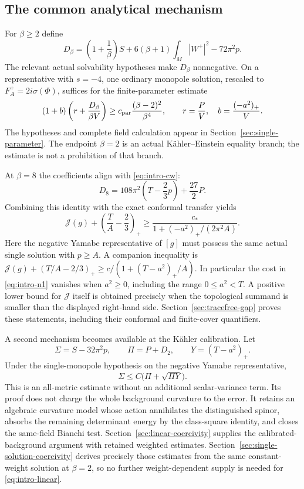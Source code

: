 \documentclass[10pt,a4paper]{article}
\theoremstyle{definition}
\theoremstyle{remark}
\numberwithin{equation}{section}
\providecommand{\J}{\mathcal J}
\begin{document}
\subsection{The common analytical mechanism}
For $\beta\ge2$ define
\[
 D_\beta=\left(1+\frac1\beta\right)S
       +6(\beta+1)\int_M|W^+|^2-72\pi^2p.
\]
The relevant actual solvability hypotheses make $D_\beta$ nonnegative.
On a representative with $s=-4$, one ordinary monopole solution, rescaled
to $F_A^+=2i\sigma(\Phi)$, suffices for the finite-parameter estimate
\begin{equation}\label{eq:intro-parameter}
 (1+b)\left(r+\frac{D_\beta}{\beta V}\right)
 \ge c_{\rm par}\frac{(\beta-2)^2}{\beta^4},
 \qquad r=\frac{P}{V},\quad b=\frac{(-a^2)_+}{V}.
\end{equation}
The hypotheses and complete field calculation appear in
Section~\ref{sec:single-parameter}. The endpoint $\beta=2$ is an actual
Kähler--Einstein equality branch; the estimate is not a prohibition of
that branch.

At $\beta=8$ the coefficients align with \eqref{eq:intro-cw}:
\[
 D_8=108\pi^2\left(T-\frac23p\right)+\frac{27}{2}P.
\]
Combining this identity with the exact conformal transfer yields
\begin{equation}\label{eq:intro-n1}
 \J(g)+\left(\frac TA-\frac23\right)_+
 \ge\frac{c_*}{1+(-a^2)_+/(2\pi^2A)}.
\end{equation}
Here the negative Yamabe representative of $[g]$ must possess the same
actual single solution with $p\ge A$. A companion inequality is
$\J(g)+(T/A-2/3)_+\ge c/(1+(T-a^2)_+/A)$. In particular the
cost in \eqref{eq:intro-n1} vanishes when $a^2\ge0$, including the
range $0\le a^2<T$. A positive lower bound for $\J$ itself is obtained
precisely when the topological summand is smaller than the displayed
right-hand side. Section~\ref{sec:tracefree-gap} proves these statements,
including their conformal and finite-cover quantifiers.

A second mechanism becomes available at the Kähler calibration. Let
\[
 \Sigma=S-32\pi^2p,\qquad \Pi=P+D_2,
 \qquad Y=(T-a^2)_+.
\]
Under the single-monopole hypothesis on the negative Yamabe representative,
\begin{equation}\label{eq:intro-linear}
 \Sigma\le C\bigl(\Pi+\sqrt{\Pi Y}\bigr).
\end{equation}
This is an all-metric estimate without an additional scalar-variance
term. Its proof does not charge the whole background curvature to the
error. It retains an algebraic curvature model whose action annihilates
the distinguished spinor, absorbs the remaining determinant energy by
the class-square identity, and closes the same-field Bianchi test.
Section~\ref{sec:linear-coercivity} supplies the calibrated-background
argument with retained weighted estimates. Section~\ref{sec:single-solution-coercivity}
derives precisely those estimates from the same constant-weight solution
at $\beta=2$, so no further weight-dependent supply is needed for
\eqref{eq:intro-linear}.
\end{document}
